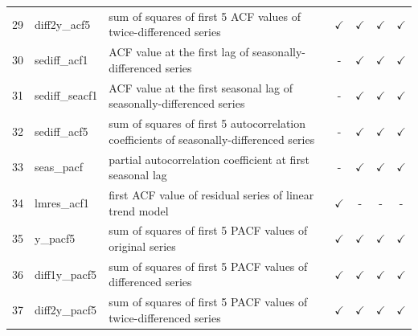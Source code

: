 \documentclass[11pt,a4paper,]{article}
\def\yes{$\checkmark$}
\begin{document}
\begin{table}[!htp]
\begin{tabular}{llp{}cccc}
29 & diff2y\_acf5   & sum of squares of first 5 ACF values of twice-differenced series                        & \yes  & \yes & \yes & \yes \\
30 & sediff\_acf1 & ACF value at the first lag of seasonally-differenced series                    & -     & \yes & \yes & \yes\\
31 & sediff\_seacf1 & ACF value at the first seasonal lag of seasonally-differenced series                    & -     & \yes & \yes & \yes\\
32 & sediff\_acf5   & sum of squares of first 5 autocorrelation coefficients of seasonally-differenced series & -     & \yes & \yes & \yes\\
33 & seas\_pacf     & partial autocorrelation coefficient at first seasonal lag & -     & \yes & \yes & \yes\\
34 & lmres\_acf1    & first ACF value of residual series of linear trend model                                & \yes  & - & - & -\\
35 & y\_pacf5       & sum of squares of first 5 PACF values of original series                                & \yes  & \yes & \yes & \yes\\
36 & diff1y\_pacf5  & sum of squares of first 5 PACF values of differenced series                             & \yes  & \yes & \yes & \yes\\
37 & diff2y\_pacf5  & sum of squares of first 5 PACF values of twice-differenced series                       & \yes  & \yes & \yes & \yes\\
\bottomrule
\end{tabular}
\end{table}
\end{document}
